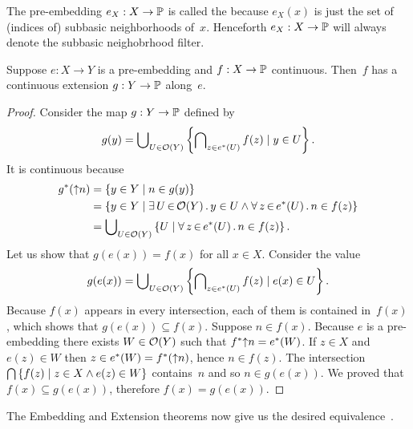 \noindent
%
The pre-embedding $e_X : X \to \mathbb{P}$ is called the  because $e_X(x)$ is just the set of (indices
of) subbasic neighborhoods of~$x$. Henceforth $e_X : X \to \mathbb{P}$
will always denote the subbasic neighobrhood filter.

\begin{theorem}
  \label{thm:scott-extension}%
  Suppose $e : X \to Y$ is a pre-embedding and $f : X \to \mathbb{P}$
  continuous. Then~$f$ has a continuous extension $g : Y \to \mathbb{P}$
  along~$e$.
\end{theorem}

\begin{proof}
  Consider the map $g : Y \to \mathbb{P}$ defined by
  \begin{equation*}
    g(y) = \bigcup\nolimits_{U \in \mathcal{O}(Y)} \left\{
      \bigcap\nolimits_{z \in e^{*}(U)} f(z)
      \mid
      y \in U
    \right\}.
  \end{equation*}
  It is continuous because
  \begin{align*}
    \invim{g}(\upper{n}) &=
    \set{y \in Y \such n \in g(y)} \\
    &=
    \set{y \in Y \such \xsome{U}{
        \topol{Y}}{y \in U \land
        \xall{z}{\invim{e}(U)}{n \in f(z)}
      }
    } \\
    &=
    \tbigcup_{U \in \topol{Y}} \left\{
        U \such
        \xall{z}{\invim{e}(U)}{n \in f(z)}
      \right\}.
  \end{align*}
  Let us show that $g(e(x)) = f(x)$ for all $x \in X$. Consider the
  value
  \begin{align*}
    g(e(x)) =
    \bigcup\nolimits_{U \in \mathcal{O}(Y)} \left\{
      \bigcap\nolimits_{z \in e^{*}(U)} f(z)
      \mid
      e(x) \in U \right\}.
  \end{align*}
  Because $f(x)$ appears in every intersection, each of them is
  contained in~$f(x)$, which shows that $g(e(x)) \subseteq f(x)$.
  Suppose $n \in f(x)$. Because $e$ is a pre-embedding there exists $W
  \in \mathcal{O}(Y)$ such that $f^{*}{{\uparrow}n} = e^{*}(W)$. If
  $z \in X$ and $e(z) \in W$ then $z \in e^{*}(W) =
  f^{*}({\uparrow}n)$, hence $n \in f(z)$. The intersection
  $\bigcap\nolimits \left\{f(z) \mid z \in X \land e(z) \in W \right\}$
  contains~$n$ and so $n \in g(e(x))$. We proved that $f(x) \subseteq
  g(e(x))$, therefore $f(x) = g(e(x))$.
\end{proof}

\noindent
%
The Embedding and Extension theorems now give us the desired
equivalence~.

